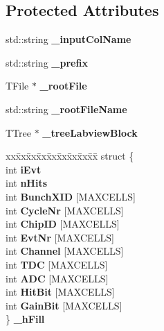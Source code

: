 \subsection*{Protected Attributes}
\begin{DoxyCompactItemize}
\item 
std\-::string {\bfseries \-\_\-input\-Col\-Name}\label{classCALICE_1_1RootTreeGenerator3_a34632b4305502a19071bc7ce5bb4bb9d}

\item 
std\-::string {\bfseries \-\_\-prefix}\label{classCALICE_1_1RootTreeGenerator3_a28a8501057a0cc2586b42f50ea341c71}

\item 
T\-File $\ast$ {\bfseries \-\_\-root\-File}\label{classCALICE_1_1RootTreeGenerator3_aa4ec8b9bbe64b45b8d88b07164c8df0b}

\item 
std\-::string {\bfseries \-\_\-root\-File\-Name}\label{classCALICE_1_1RootTreeGenerator3_a49845156d4774dbeadb167fc1583de47}

\item 
T\-Tree $\ast$ {\bfseries \-\_\-tree\-Labview\-Block}\label{classCALICE_1_1RootTreeGenerator3_a57ab8527e5a4a179f7894d4a4acbafb3}

\item 
\begin{tabbing}
xx\=xx\=xx\=xx\=xx\=xx\=xx\=xx\=xx\=\kill
struct \{\\
\>int {\bfseries iEvt}\\
\>int {\bfseries nHits}\\
\>int {\bfseries BunchXID} [MAXCELLS]\\
\>int {\bfseries CycleNr} [MAXCELLS]\\
\>int {\bfseries ChipID} [MAXCELLS]\\
\>int {\bfseries EvtNr} [MAXCELLS]\\
\>int {\bfseries Channel} [MAXCELLS]\\
\>int {\bfseries TDC} [MAXCELLS]\\
\>int {\bfseries ADC} [MAXCELLS]\\
\>int {\bfseries HitBit} [MAXCELLS]\\
\>int {\bfseries GainBit} [MAXCELLS]\\
\} {\bfseries \_hFill}\label{classCALICE_1_1RootTreeGenerator3_af5b939071eb0a559e58e5956f47b5c8a}
\\

\end{tabbing}\end{DoxyCompactItemize}
